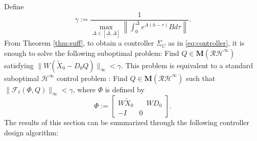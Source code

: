 \documentclass[letterpaper, 12pt, draftcls, onecolumn]{ieeeconf}
\begin{document}
Define 
\begin{equation}
\label{eq:gamma}
\gamma := \frac{1}{{\displaystyle　\max_{\Delta \in [\underline \Delta, \overline \Delta]}} \left\|\int^{\Delta}_0
	e^{A(h-\tau)}B d\tau\right\|}.
\end{equation}
From Theorem \ref{thm:suff}, to obtain a controller $\Sigma_C$ as in  \eqref{eq:controller},
it is enough to solve the following suboptimal problem:
Find $Q \in \mathbf{M}(\mathcal{RH}^{\infty})$ satisfying
$\|W(\tilde X_0 - D_0 Q)\|_{\infty} < \gamma$.
This problem is equivalent to a standard suboptimal $\mathcal{H}^{\infty}$ control problem
\cite[Chaps.~16,~17]{zhou1996}:
Find $Q \in \mathbf{M}(\mathcal{RH}^{\infty})$ such that 
$\|\mathcal{F}_{\ell}(\Phi,Q)\|_{\infty} < \gamma$, where $\Phi$ is defined by
\begin{equation}
\label{eq:G_def}
\Phi:=
\begin{bmatrix}
W\tilde X_0  &\quad WD_0  \\
-I & 0
\end{bmatrix}.
\end{equation}
The results of this section can be summarized through the following controller design algorithm:
\end{document}
